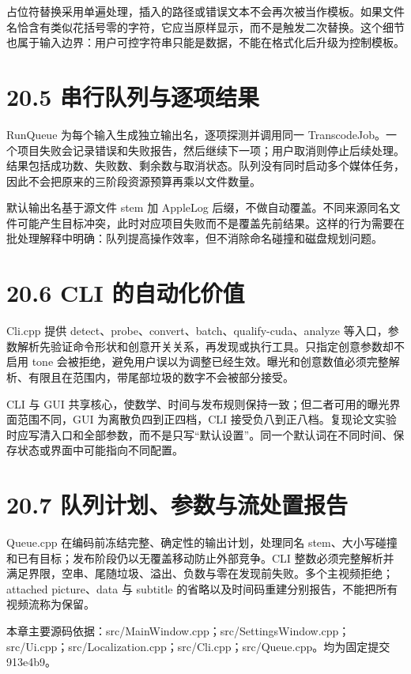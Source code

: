 \documentclass[UTF8,zihao=-4,openany]{ctexbook}
\begin{document}
占位符替换采用单遍处理，插入的路径或错误文本不会再次被当作模板。如果文件名恰含有类似花括号零的字符，它应当原样显示，而不是触发二次替换。这个细节也属于输入边界：用户可控字符串只能是数据，不能在格式化后升级为控制模板。


\section*{20.5 串行队列与逐项结果}
RunQueue 为每个输入生成独立输出名，逐项探测并调用同一 TranscodeJob。一个项目失败会记录错误和失败报告，然后继续下一项；用户取消则停止后续处理。结果包括成功数、失败数、剩余数与取消状态。队列没有同时启动多个媒体任务，因此不会把原来的三阶段资源预算再乘以文件数量。

默认输出名基于源文件 stem 加 AppleLog 后缀，不做自动覆盖。不同来源同名文件可能产生目标冲突，此时对应项目失败而不是覆盖先前结果。这样的行为需要在批处理解释中明确：队列提高操作效率，但不消除命名碰撞和磁盘规划问题。


\section*{20.6 CLI 的自动化价值}
Cli.cpp 提供 detect、probe、convert、batch、qualify-cuda、analyze 等入口，参数解析先验证命令形状和创意开关关系，再发现或执行工具。只指定创意参数却不启用 tone 会被拒绝，避免用户误以为调整已经生效。曝光和创意数值必须完整解析、有限且在范围内，带尾部垃圾的数字不会被部分接受。

CLI 与 GUI 共享核心，使数学、时间与发布规则保持一致；但二者可用的曝光界面范围不同，GUI 为离散负四到正四档，CLI 接受负八到正八档。复现论文实验时应写清入口和全部参数，而不是只写“默认设置”。同一个默认词在不同时间、保存状态或界面中可能指向不同配置。


\section*{20.7 队列计划、参数与流处置报告}
Queue.cpp 在编码前冻结完整、确定性的输出计划，处理同名 stem、大小写碰撞和已有目标；发布阶段仍以无覆盖移动防止外部竞争。CLI 整数必须完整解析并满足界限，空串、尾随垃圾、溢出、负数与零在发现前失败。多个主视频拒绝；attached picture、data 与 subtitle 的省略以及时间码重建分别报告，不能把所有视频流称为保留。


\par\small 本章主要源码依据：src/MainWindow.cpp；src/SettingsWindow.cpp；src/Ui.cpp；src/Localization.cpp；src/Cli.cpp；src/Queue.cpp。均为固定提交 913e4b9。\normalsize
\end{document}
